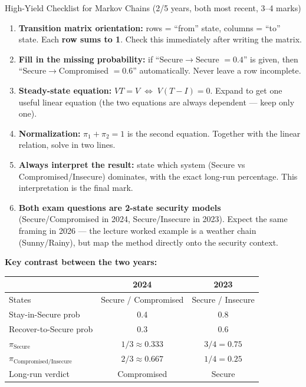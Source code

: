 \documentclass[12pt,a4paper]{article}
\begin{document}
\begin{keybox}{High-Yield Checklist for Markov Chains (2/5 years, both most recent, 3--4 marks)}
\begin{enumerate}[noitemsep]
  \item \textbf{Transition matrix orientation:} rows = ``from'' state, columns = ``to'' state. Each \textbf{row sums to 1}. Check this immediately after writing the matrix.
  \item \textbf{Fill in the missing probability:} if ``Secure$\to$Secure $= 0.4$'' is given, then ``Secure$\to$Compromised $= 0.6$'' automatically. Never leave a row incomplete.
  \item \textbf{Steady-state equation:} $VT = V \;\Leftrightarrow\; V(T-I) = 0$. Expand to get one useful linear equation (the two equations are always dependent --- keep only one).
  \item \textbf{Normalization:} $\pi_1 + \pi_2 = 1$ is the second equation. Together with the linear relation, solve in two lines.
  \item \textbf{Always interpret the result:} state which system (Secure vs Compromised/Insecure) dominates, with the exact long-run percentage. This interpretation is the final mark.
  \item \textbf{Both exam questions are 2-state security models} (Secure/Compromised in 2024, Secure/Insecure in 2023). Expect the same framing in 2026 --- the lecture worked example is a weather chain (Sunny/Rainy), but map the method directly onto the security context.
\end{enumerate}

\medskip
\textbf{Key contrast between the two years:}
\begin{center}
\begin{tabular}{lcc}
\toprule
 & \textbf{2024} & \textbf{2023} \\
\midrule
States & Secure / Compromised & Secure / Insecure \\
Stay-in-Secure prob & 0.4 & 0.8 \\
Recover-to-Secure prob & 0.3 & 0.6 \\
$\pi_{\text{Secure}}$ & $1/3 \approx 0.333$ & $3/4 = 0.75$ \\
$\pi_{\text{Compromised/Insecure}}$ & $2/3 \approx 0.667$ & $1/4 = 0.25$ \\
Long-run verdict & Compromised & Secure \\
\bottomrule
\end{tabular}
\end{center}
\end{keybox}
\end{document}
